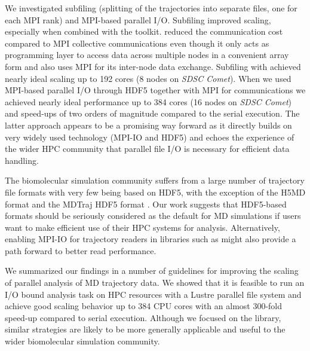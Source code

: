 We investigated subfiling (splitting of the trajectories into separate files, one for each MPI rank) and MPI-based parallel I/O.
Subfiling improved scaling, especially when combined with the  toolkit.
 reduced the communication cost compared to MPI collective communications even though it only acts as programming layer to access data across multiple nodes in a convenient array form and also uses MPI for its inter-node data exchange.
Subfiling with  achieved nearly ideal scaling up to 192 cores (8 nodes on \emph{SDSC Comet}).
When we used MPI-based parallel I/O through HDF5 together with MPI for communications we achieved nearly ideal performance up to 384 cores (16 nodes on \emph{SDSC Comet}) and speed-ups of two orders of magnitude compared to the serial execution.
The latter approach appears to be a promising way forward as it directly builds on very widely used technology (MPI-IO and HDF5) and echoes the experience of the wider HPC community that parallel file I/O is necessary for efficient data handling.

The biomolecular simulation community suffers from a large number of trajectory file formats with very few being based on HDF5, with the exception of the H5MD format \cite{Buyl:2014aa} and the MDTraj HDF5 format \cite{McGibbon:2015aa}.
Our work suggests that HDF5-based formats should be seriously considered as the default for MD simulations if users want to make efficient use of their HPC systems for analysis. 
Alternatively, enabling MPI-IO for trajectory readers in libraries such as  might also provide a path forward to better read performance.

We summarized our findings in a number of guidelines for improving the scaling of parallel analysis of MD trajectory data.
We showed that it is feasible to run an I/O bound analysis task on HPC resources with a Lustre parallel file system and achieve good scaling behavior up to 384 CPU cores with an almost 300-fold speed-up compared to serial execution.
Although we focused on the  library, similar strategies are likely to be more generally applicable and useful to the wider biomolecular simulation community.


